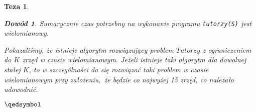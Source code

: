 \documentclass[12pt]{article}
\newtheorem*{theorem*}{Teza}
\newtheorem*{proof*}{Dowód}
\begin{document}
\begin{titlepage}
\begin{theorem*}
\begin{proof*}
Sumarycznie czas potrzebny na wykonanie programu \texttt{tutorzy(S)} jest 
wielomianowy.

$ $\\
Pokazaliśmy, że istnieje algorytm rozwiązujący problem $Tutorzy$ z 
ograniczeniem do $K$ zrzęd w czasie wielomianowym. Jeżeli istnieje taki 
algorytm dla dowolnej stałej $K$, to w szczególności da się rozwiązać taki 
problem w czasie wielomianowym przy założeniu, że będzie co najwyżej 15 zrzęd, 
co należało udowodnić.
\begin{flushright}
    $\qedsymbol$
\end{flushright}

\end{proof*} \end{theorem*}

\end{titlepage}
\end{document}
